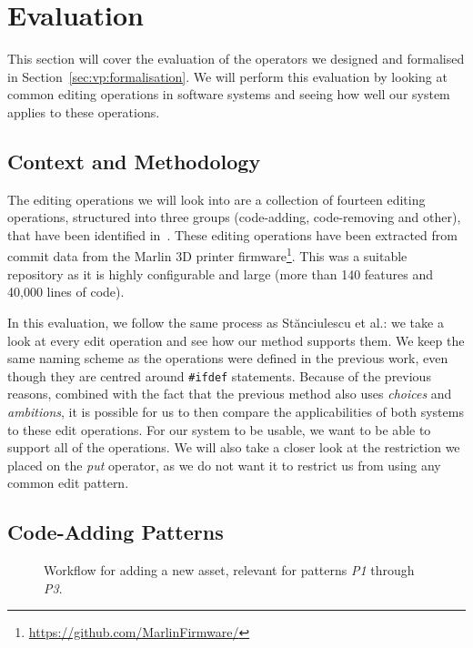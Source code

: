 \chapter{Evaluation}\label{sec:evaluation}
This section will cover the evaluation of the operators we designed and
formalised in Section~\ref{sec:vp:formalisation}. We will perform this
evaluation by looking at common editing operations in software systems and
seeing how well our system applies to these operations.

\section{Context and Methodology}
The editing operations we will look into are a collection of fourteen editing
operations, structured into three groups (code-adding, code-removing and other), 
that have been identified in~\cite{stuanciulescu2016}. These editing operations
have been extracted from commit data from the Marlin 3D printer firmware\footnote{\url{https://github.com/MarlinFirmware/}}.
This was a suitable repository as it is highly configurable and large (more than 140
features and 40,000 lines of code). 

In this evaluation, we follow the same process as St{\u{a}}nciulescu et al.: we
take a look at every edit operation and see how our method supports them. We keep
the same naming scheme as the operations were defined in the previous work, even
though they are centred around \texttt{\#ifdef} statements. Because of the previous
reasons, combined with the fact that the previous method also uses \emph{choices}
and \emph{ambitions}, it is possible for us to then compare the applicabilities 
of both systems to these edit operations. For our system to be usable, we
want to be able to support all of the operations. We will also take a closer look 
at the restriction we placed on the \emph{put} operator, as we do not want it to
restrict us from using any common edit pattern.
\clearpage
\section{Code-Adding Patterns}
\begin{wrapfigure}{r}{0.4\textwidth}
  \centering
  \caption{Workflow for adding a new asset, relevant for patterns \emph{P1} through \emph{P3}.}
  \label{fig:patterns:p1}
\end{wrapfigure}
